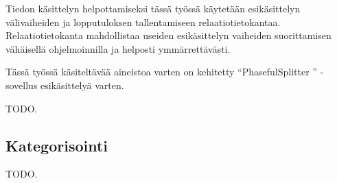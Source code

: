 Tiedon käsittelyn helpottamiseksi tässä työssä käytetään esikäsittelyn
välivaiheiden ja lopputuloksen tallentamiseen
relaatiotietokantaa. Relaatiotietokanta mahdollistaa useiden
esikäsittelyn vaiheiden suorittamisen vähäisellä ohjelmoinnilla ja
helposti ymmärrettävästi.

Tässä työssä käsiteltävää aineistoa varten on kehitetty ``PhasefulSplitter
'' -sovellus esikäsittelyä varten.

TODO.

\subsection{Kategorisointi}

TODO.
